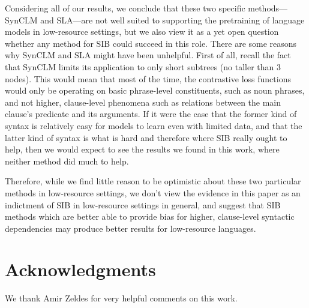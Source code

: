 \documentclass[11pt]{article}
\begin{document}
Considering all of our results, we conclude that these two specific methods---SynCLM and SLA---are not well suited to supporting the pretraining of language models in low-resource settings, but we also view it as a yet open question whether any method for SIB could succeed in this role.
There are some reasons why SynCLM and SLA might have been unhelpful.
First of all, recall the fact that SynCLM limits its application to only short subtrees (no taller than 3 nodes).
This would mean that most of the time, the contrastive loss functions would only be operating on basic phrase-level constituents, such as noun phrases, and not higher, clause-level phenomena such as relations between the main clause's predicate and its arguments.
If it were the case that the former kind of syntax is relatively easy for models to learn even with limited data, and that the latter kind of syntax is what is hard and therefore where SIB really ought to help, then we would expect to see the results we found in this work, where neither method did much to help.

Therefore, while we find little reason to be optimistic about these two particular methods in low-resource settings, we don't view the evidence in this paper as an indictment of SIB in low-resource settings in general, and suggest that SIB methods which are better able to provide bias for higher, clause-level syntactic dependencies may produce better results for low-resource languages.




\section*{Acknowledgments}
We thank Amir Zeldes for very helpful comments on this work.
\end{document}
